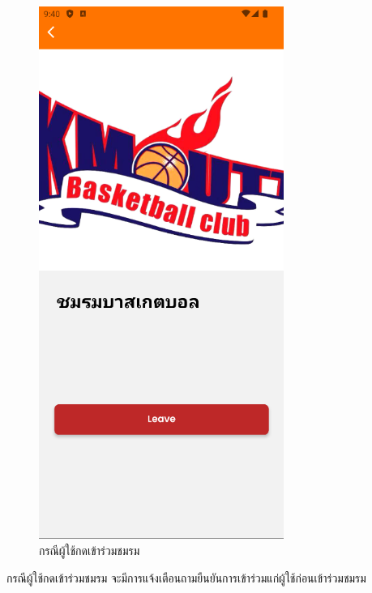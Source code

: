 \documentclass[14pt,oneside,openright,a4paper]{cpe-thai-project}
\begin{document}
\begin{figure}[!h]\centering
  \includegraphics[width=8cm]{./Pictures/Scene8.png}
  \caption{กรณีผู้ใช้กดเข้าร่วมชมรม}\label{fig:JoinClubTest}
\end{figure}
  \hspace*{1cm} กรณีผู้ใช้กดเข้าร่วมชมรม จะมีการแจ้งเตือนถามยืนยันการเข้าร่วมแก่ผู้ใช้ก่อนเข้าร่วมชมรม

\newpage
\end{document}
